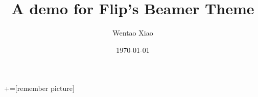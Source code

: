 \documentclass[12 pt]{beamer}
\author[Wentao Xiao\quad {wentao.xiaoo@mail.dhu.edu.cn}]{Wentao Xiao}
\title[A demo for Flip's Beamer Theme]{A demo for Flip's Beamer Theme}
\institute{Donghua University}
\date{\today}
\begin{document}

+=[remember picture]





%
\end{document}
